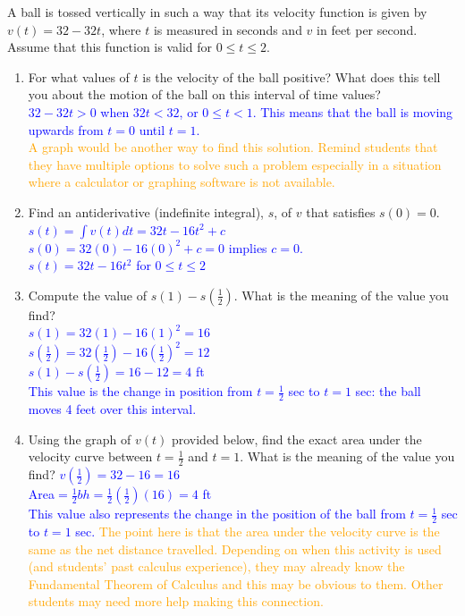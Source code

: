 \documentclass{ximera}
\begin{document}
  \begin{exercise}  
    A ball is tossed vertically in such a way that its velocity function is given by $v(t)=32-32t$, where $t$ is measured in seconds and $v$ in feet per second. Assume that this function is valid for $0\leq t\leq2$.
    \begin{enumerate}
        \item[A.] For what values of $t$ is the velocity of the ball positive?  What does this tell you about the motion of the ball on this interval of time values?\\
        \textcolor{blue}{ $32-32t>0$ when $32t<32$, or $0\leq t<1$.  This means that the ball is moving upwards from $t=0$ until $t=1$.}\\
        \textcolor{orange}{ A graph would be another way to find this solution.  Remind students that they have multiple options to solve such a problem especially in a situation where a calculator or graphing software is not available.}
        
        \item[B.] Find an antiderivative (indefinite integral), $s$, of $v$ that satisfies $s(0)=0$.\\
        \textcolor{blue}{ $s(t)=\int v(t)dt=32t-16t^2+c$\\
        $s(0)=32(0)-16(0)^2+c=0$ implies $c=0$.\\
        $s(t)=32t-16t^2$ for $0\leq t\leq2$}\\
        
        \item[C.] Compute the value of $s(1)-s(\frac12)$.  What is the meaning of the value you find?\\
        \textcolor{blue}{ $s(1)=32(1)-16(1)^2=16$\\
        $s(\frac12)=32(\frac12)-16(\frac12)^2=12$\\
        $s(1)-s(\frac12)=16-12=4$ ft\\
        This value is the change in position from $t=\frac12$ sec to $t=1$ sec: the ball moves 4 feet over this interval.}
        \item[D.] Using the graph of $v(t)$ provided below, find the exact area under the velocity curve between $t=\frac12$ and $t=1$.  What is the meaning of the value you find? 
        \textcolor{blue}{ $v(\frac{1}{2})=32-16=16$\\
        Area$=\frac12bh=\frac12(\frac12)(16)=4$ ft\\
        This value also represents the change in the position of the ball from $t=\frac12$ sec to $t=1$ sec.}
        \textcolor{orange}{ The point here is that the area under the velocity curve is the same as the net distance travelled.  Depending on when this activity is used (and students' past calculus experience), they may already know the Fundamental Theorem of Calculus and this may be obvious to them. Other students may need more help making this connection.}
        

\end{enumerate}
\end{exercise}
\end{document}
